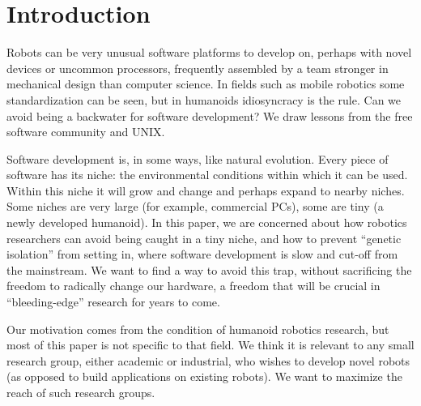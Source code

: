 

\section{Introduction}


Robots can be very unusual software platforms to develop on, perhaps
with novel devices or uncommon processors, frequently assembled by a
team stronger in mechanical design than computer science.  In fields
such as mobile robotics some standardization can be seen, but in
humanoids idiosyncracy is the rule.  Can we avoid being a backwater for
software development?  We draw lessons from the free software community
and UNIX.


Software development is, in some ways, like natural 
evolution.  Every piece of software has its niche:
the environmental conditions within which it can be
used.  Within this niche it will grow and change and 
perhaps expand to nearby niches.
Some niches are very large (for example, commercial PCs), some are
tiny (a newly developed humanoid).  In this paper, we are concerned
about how robotics researchers can avoid being caught in a tiny
niche, and how to prevent ``genetic isolation'' from setting in,
where software development is slow and cut-off from the mainstream.
We want to find a way to avoid this trap, without sacrificing
the freedom to radically change our hardware, a freedom that
will be crucial in ``bleeding-edge'' research for years to come.

Our motivation comes from the condition of humanoid robotics 
research, but most of this paper is not specific to that field.
%
We think it is relevant to any small research group, either academic or
industrial, who wishes to develop novel robots (as opposed to 
build applications on existing robots).  We want to maximize the 
reach of such research groups.








